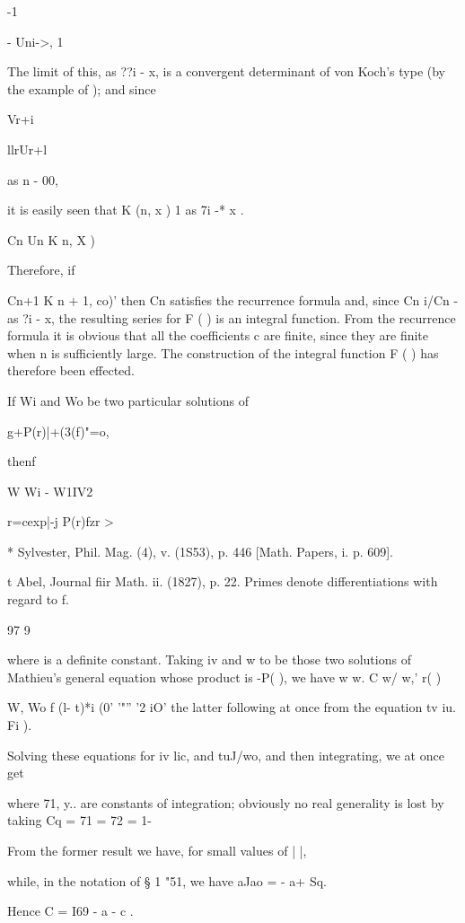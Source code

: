 -1

- Uni->, 1

The limit of this, as ??i - x, is a convergent determinant of von
Koch's type (by the example of ); and since

Vr+i

llrUr+l

as n - 00,

it is easily seen that K (n, x ) 1 as 7i -* x .

Cn Un K n, X )

Therefore, if

Cn+1 K n + 1, co)' then Cn satisfies the recurrence formula and, since
Cn i/Cn - as ?i - x, the resulting series for F ( ) is an integral
function. From the recurrence formula it is obvious that all the
coefficients c are finite, since they are finite when n is
sufficiently large. The construction of the integral function F ( )
has therefore been effected.

If Wi and
Wo be two particular solutions of

g+P(r)|+(3(f)"=o,

thenf

W Wi - W1IV2

r=cexp|-j P(r)fzr >

* Sylvester, Phil. Mag. (4), v. (1S53), p. 446 [Math. Papers, i. p.
609].

t Abel, Journal fiir Math. ii. (1827), p. 22. Primes denote
differentiations with regard to f.

97 9

%
%

where is a definite constant. Taking iv and w to be those two
solutions of Mathieu's general equation whose product is -P( ), we
have w w. C w/ w,' r( )

W, Wo f (l- t)*i (0' '"'' '2 iO' the latter following at once from the
equation tv iu. Fi ).

Solving these equations for iv lic, and tuJ/wo, and then integrating,
we at once get

where 71, y.. are constants of integration; obviously no real
generality is lost by taking Cq = 71 = 72 = 1-

From the former result we have, for small values of | |,

while, in the notation of § 1 "51, we have aJao = - a+ Sq.

Hence C = I69 - a - c .

